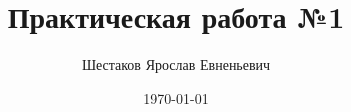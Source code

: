 \documentclass[14pt,a4paper,oneside]{extarticle}
\author{Шестаков Ярослав Евненьевич}
\title{Практическая работа №1}
\date{\today}
\begin{document}
\renewcommand{\figurename}{Рисунок}


\tableofcontents


\end{document}
